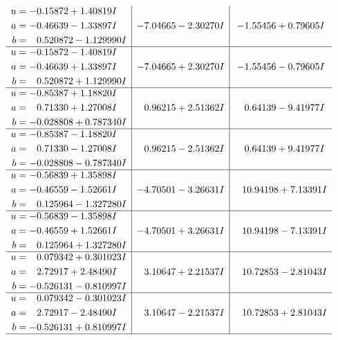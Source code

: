 \documentclass[1p]{elsarticle_modified}
\theoremstyle{definition}
\begin{document}
$$\begin{array}{c|c|c}
\begin{aligned}
u &= -0.15872 + 1.40819 I \\
a &= -0.46639 - 1.33897 I \\
b &= \phantom{-}0.520872 - 1.129990 I\end{aligned}
 & -7.04665 - 2.30270 I & -1.55456 + 0.79605 I \\ \hline\begin{aligned}
u &= -0.15872 - 1.40819 I \\
a &= -0.46639 + 1.33897 I \\
b &= \phantom{-}0.520872 + 1.129990 I\end{aligned}
 & -7.04665 + 2.30270 I & -1.55456 - 0.79605 I \\ \hline\begin{aligned}
u &= -0.85387 + 1.18820 I \\
a &= \phantom{-}0.71330 + 1.27008 I \\
b &= -0.028808 + 0.787340 I\end{aligned}
 & \phantom{-}0.96215 + 2.51362 I & \phantom{-}0.64139 - 9.41977 I \\ \hline\begin{aligned}
u &= -0.85387 - 1.18820 I \\
a &= \phantom{-}0.71330 - 1.27008 I \\
b &= -0.028808 - 0.787340 I\end{aligned}
 & \phantom{-}0.96215 - 2.51362 I & \phantom{-}0.64139 + 9.41977 I \\ \hline\begin{aligned}
u &= -0.56839 + 1.35898 I \\
a &= -0.46559 - 1.52661 I \\
b &= \phantom{-}0.125964 - 1.327280 I\end{aligned}
 & -4.70501 - 3.26631 I & \phantom{-}10.94198 + 7.13391 I \\ \hline\begin{aligned}
u &= -0.56839 - 1.35898 I \\
a &= -0.46559 + 1.52661 I \\
b &= \phantom{-}0.125964 + 1.327280 I\end{aligned}
 & -4.70501 + 3.26631 I & \phantom{-}10.94198 - 7.13391 I \\ \hline\begin{aligned}
u &= \phantom{-}0.079342 + 0.301023 I \\
a &= \phantom{-}2.72917 + 2.48490 I \\
b &= -0.526131 - 0.810997 I\end{aligned}
 & \phantom{-}3.10647 + 2.21537 I & \phantom{-}10.72853 - 2.81043 I \\ \hline\begin{aligned}
u &= \phantom{-}0.079342 - 0.301023 I \\
a &= \phantom{-}2.72917 - 2.48490 I \\
b &= -0.526131 + 0.810997 I\end{aligned}
 & \phantom{-}3.10647 - 2.21537 I & \phantom{-}10.72853 + 2.81043 I\\
 \hline 
 \end{array}$$\newpage\newpage\renewcommand{\arraystretch}{1}
\end{document}

